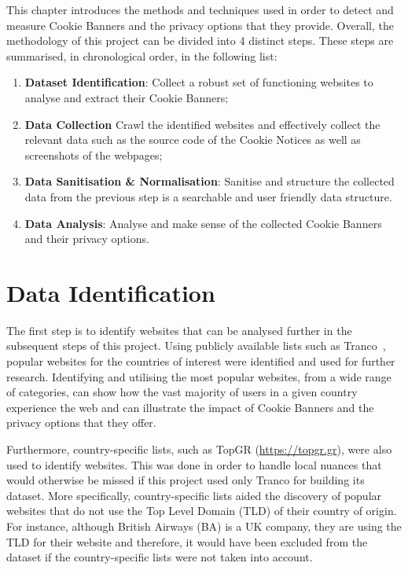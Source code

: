 \documentclass[../main.tex]{subfiles}
\begin{document}
This chapter introduces the methods and techniques used in order to detect and measure Cookie Banners and the privacy options that they provide. Overall, the methodology of this project can be divided into 4 distinct steps. These steps are summarised, in chronological order, in the following list:

\begin{enumerate}
    \item \textbf{Dataset Identification}: Collect a robust set of functioning websites to analyse and extract their Cookie Banners;
    
    \item \textbf{Data Collection} Crawl the identified websites and effectively collect the relevant data such as the source code of the Cookie Notices as well as screenshots of the webpages;
    
    \item \textbf{Data Sanitisation \& Normalisation}: Sanitise and structure the collected data from the previous step is a searchable and user friendly data structure.
    
    \item \textbf{Data Analysis}: Analyse and make sense of the collected Cookie Banners and their privacy options. 
\end{enumerate}

\section{Data Identification}
The first step is to identify websites that can be analysed further in the subsequent steps of this project. Using publicly available lists such as Tranco~\cite{LePochat2019}, popular websites for the countries of interest were identified and used for further research. Identifying and utilising the most popular websites, from a wide range of categories, can show how the vast majority of users in a given country experience the web and can illustrate the impact of Cookie Banners and the privacy options that they offer.

Furthermore, country-specific lists, such as TopGR (\url{https://topgr.gr}), were also used to identify websites. This was done in order to handle local nuances that would otherwise be missed if this project used only Tranco for building its dataset. More specifically, country-specific lists aided the discovery of popular websites that do not use the Top Level Domain (TLD) of their country of origin. For instance, although British Airways (BA) is a UK company, they are using the  TLD for their website and therefore, it would have been excluded from the dataset if the country-specific lists were not taken into account.
\end{document}
